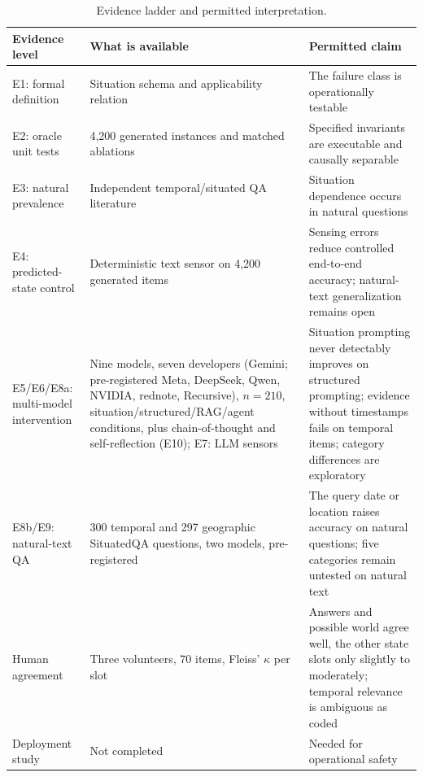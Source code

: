\begin{table}[t]
\caption{Evidence ladder and permitted interpretation.}
\label{tab:evidence-ladder}
\centering\scriptsize
\setlength{\tabcolsep}{4pt}%
\begin{tabularx}{\textwidth}{@{}>{\raggedright\arraybackslash}p{2.7cm}X>{\raggedright\arraybackslash}p{5.0cm}@{}}
\toprule
Evidence level & What is available & Permitted claim \\
\midrule
E1: formal definition & Situation schema and applicability relation & The failure class is operationally testable \\
E2: oracle unit tests & 4,200 generated instances and matched ablations & Specified invariants are executable and causally separable \\
E3: natural prevalence & Independent temporal/situated QA literature & Situation dependence occurs in natural questions \\
E4: predicted-state control & Deterministic text sensor on 4,200 generated items & Sensing errors reduce controlled end-to-end accuracy; natural-text generalization remains open \\
E5/E6/E8a: multi-model intervention & Nine models, seven developers (Gemini; pre-registered Meta, DeepSeek, Qwen, NVIDIA, rednote, Recursive), $n=210$, situation/structured/RAG/agent conditions, plus chain-of-thought and self-reflection (E10); E7: LLM sensors & Situation prompting never detectably improves on structured prompting; evidence without timestamps fails on temporal items; category differences are exploratory \\
E8b/E9: natural-text QA & 300 temporal and 297 geographic SituatedQA questions, two models, pre-registered & The query date or location raises accuracy on natural questions; five categories remain untested on natural text \\
Human agreement & Three volunteers, 70 items, Fleiss' $\kappa$ per slot & Answers and possible world agree well, the other state slots only slightly to moderately; temporal relevance is ambiguous as coded \\
Deployment study & Not completed & Needed for operational safety \\
\bottomrule
\end{tabularx}
\end{table}
